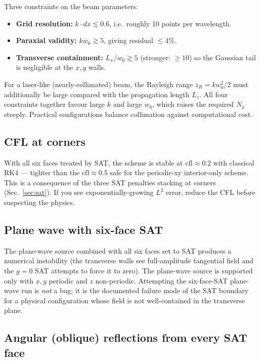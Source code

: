 \documentclass[11pt]{article}
\begin{document}
Three constraints on the beam parameters:
\begin{itemize}
  \item \textbf{Grid resolution:} $k \cdot dx \lesssim 0.6$, i.e.\ roughly
        10 points per wavelength.
  \item \textbf{Paraxial validity:} $k w_0 \gtrsim 5$, giving residual
        $\leq 4\%$.
  \item \textbf{Transverse containment:} $L_x / w_0 \gtrsim 5$
        (stronger: $\geq 10$) so the Gaussian tail is negligible at
        the $x, y$ walls.
\end{itemize}
For a laser-like (nearly-collimated) beam, the Rayleigh range
$z_R = k w_0^2 / 2$ must additionally be large compared with the
propagation length $L_z$. All four constraints together favour large
$k$ and large $w_0$, which raises the required $N_x$ steeply. Practical
configurations balance collimation against computational cost.

\subsection{CFL at corners}

With all six faces treated by SAT, the scheme is stable at
$\mathrm{cfl} \approx 0.2$ with classical RK4 — tighter than the
$\mathrm{cfl} \approx 0.5$ safe for the periodic-xy interior-only
scheme. This is a consequence of the three SAT penalties stacking at
corners (Sec.~\ref{sec:sat}). If you see exponentially-growing $L^2$
error, reduce the CFL before suspecting the physics.

\subsection{Plane wave with six-face SAT}

The plane-wave source combined with all six faces set to SAT produces a
numerical instability (the transverse walls see full-amplitude
tangential field and the $g = 0$ SAT attempts to force it to zero). The
plane-wave source is supported only with $x, y$ periodic and $z$
non-periodic. Attempting the six-face-SAT plane-wave run is \emph{not}
a bug; it is the documented failure mode of the SAT boundary for a
physical configuration whose field is not well-contained in the
transverse plane.

\subsection{Angular (oblique) reflections from every SAT face}
\label{sec:oblique-reflection}
\end{document}
